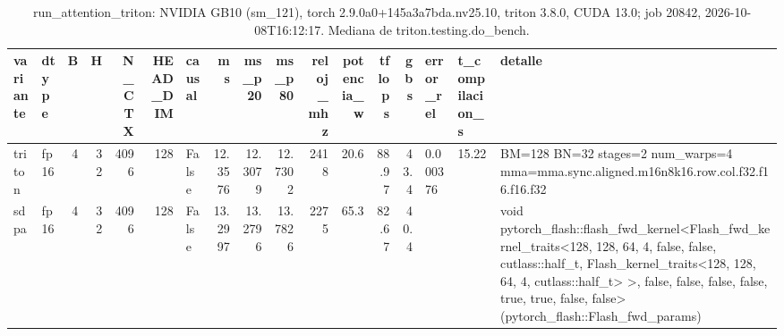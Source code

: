 \begin{table}[htbp]
  \centering\small
  \begin{tabular}{llrrrrlrrrrrrrlll}
    \toprule
    variante & dtype & B & H & N\_CTX & HEAD\_DIM & causal & ms & ms\_p20 & ms\_p80 & reloj\_mhz & potencia\_w & tflops & gbs & error\_rel & t\_compilacion\_s & detalle \\
    \midrule
    triton & fp16 & 4 & 32 & 4096 & 128 & False & 12.3576 & 12.3079 & 12.7302 & 2418 & 20.6 & 88.97 & 43.4 & 0.000376 & 15.22 & BM=128 BN=32 stages=2 num\_warps=4 mma=mma.sync.aligned.m16n8k16.row.col.f32.f16.f16.f32 \\
    sdpa & fp16 & 4 & 32 & 4096 & 128 & False & 13.2997 & 13.2796 & 13.7826 & 2275 & 65.3 & 82.67 & 40.4 &  &  & void pytorch\_flash::flash\_fwd\_kernel<Flash\_fwd\_kernel\_traits<128, 128, 64, 4, false, false, cutlass::half\_t, Flash\_kernel\_traits<128, 128, 64, 4, cutlass::half\_t> >, false, false, false, false, true, true, false, false>(pytorch\_flash::Flash\_fwd\_params) \\
    \bottomrule
  \end{tabular}
  \caption{run\_attention\_triton: NVIDIA GB10 (sm\_121), torch 2.9.0a0+145a3a7bda.nv25.10, triton 3.8.0, CUDA 13.0; job 20842, 2026-10-08T16:12:17. Mediana de triton.testing.do\_bench.}
  \label{tab:hennessy-frio-run-attention-triton}
\end{table}
